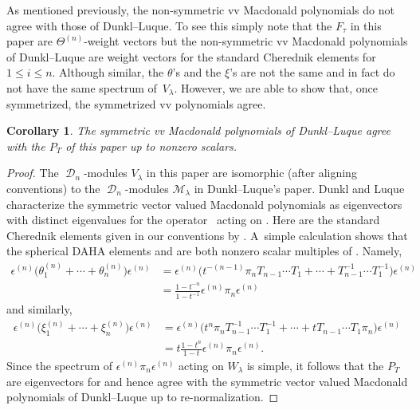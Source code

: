 \documentclass[pdftex]{sigma}
\numberwithin{equation}{section}
\newtheorem{Corollary}[Theorem]{Corollary}
\theoremstyle{definition}
\DeclareMathOperator{\sD}{\mathscr{D}}
\begin{document}
As mentioned previously, the non-symmetric vv Macdonald polynomials do not agree with those of Dunkl--Luque. To see this simply note that the $F_{\tau}$ in this paper are $\Theta^{(n)}$-weight vectors but the non-symmetric vv Macdonald polynomials of Dunkl--Luque are weight vectors for the standard Cherednik elements  for $1\leq i\leq n$. Although similar, the $\theta$'s and the $\xi$'s are not the same and in fact do not have the same spectrum of~$V_{\lambda}$. However, we are able to show that, once symmetrized, the symmetrized vv polynomials agree.

\begin{Corollary}\label{Corollary recovering sym vv Macd}
 The symmetric vv Macdonald polynomials of Dunkl--Luque {\rm\cite[\emph{Theorem} 5.27]{DL_2011}} agree with the $P_T$ of this paper up to nonzero scalars.
\end{Corollary}

\begin{proof}
 The $\sD_n$-modules $V_{\lambda}$ in this paper are isomorphic (after aligning conventions) to the $\sD_n$-modules $\mathcal{M}_{\lambda}$ in Dunkl--Luque's paper. Dunkl and Luque characterize the symmetric vector valued Macdonald polynomials as eigenvectors with distinct eigenvalues for the operator~ acting on . Here  are the standard Cherednik elements given in our conventions by . A~simple calculation shows that the spherical DAHA elements  and  are both nonzero scalar multiples of . Namely,
 \begin{align*}
 \epsilon^{(n)}\bigl(\theta^{(n)}_1+\cdots + \theta^{(n)}_n\bigr)\epsilon^{(n)} &= \epsilon^{(n)}\bigl(t^{-(n-1)}\pi_nT_{n-1}\cdots T_1+\cdots + T_{n-1}^{-1}\cdots T_{1}^{-1}\bigr)\epsilon^{(n)}\\
 &= \frac{1-t^{-n}}{1-t^{-1}}\epsilon^{(n)} \pi_n \epsilon^{(n)}
 \end{align*}
 and similarly,
 \begin{align*}
 \epsilon^{(n)}\bigl(\xi^{(n)}_1+\cdots + \xi^{(n)}_n\bigr)\epsilon^{(n)} &= \epsilon^{(n)}\bigl(t^n \pi_n T_{n-1}^{-1}\cdots T_1^{-1}+\cdots +tT_{n-1}\cdots T_1\pi_n\bigr)\epsilon^{(n)}\\
 & = t\frac{1-t^n}{1-t}\epsilon^{(n)}\pi_n\epsilon^{(n)}.
 \end{align*}
 Since the spectrum of $\epsilon^{(n)}\pi_n\epsilon^{(n)}$ acting on $W_{\lambda}$ is simple, it follows that the $P_T$ are eigenvectors for  and hence agree with the symmetric vector valued Macdonald polynomials of Dunkl--Luque up to re-normalization.
\end{proof}
\end{document}
